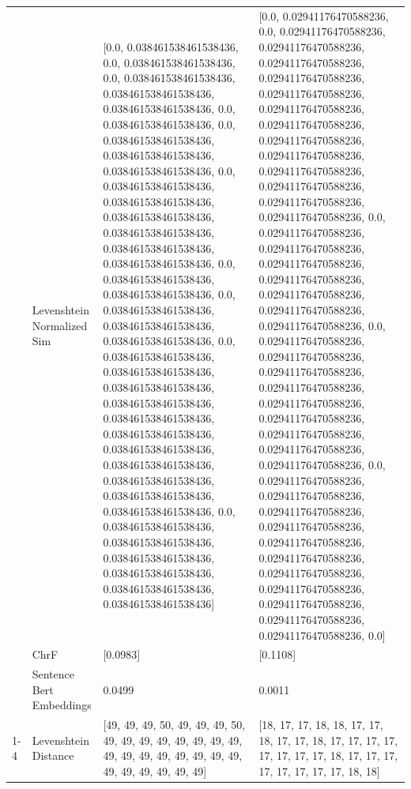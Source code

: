 \begin{tabular}{llll}
 & Levenshtein Normalized Sim & [0.0, 0.038461538461538436, 0.0, 0.038461538461538436, 0.0, 0.038461538461538436, 0.038461538461538436, 0.038461538461538436, 0.0, 0.038461538461538436, 0.0, 0.038461538461538436, 0.038461538461538436, 0.038461538461538436, 0.0, 0.038461538461538436, 0.038461538461538436, 0.038461538461538436, 0.038461538461538436, 0.038461538461538436, 0.038461538461538436, 0.0, 0.038461538461538436, 0.038461538461538436, 0.0, 0.038461538461538436, 0.038461538461538436, 0.038461538461538436, 0.0, 0.038461538461538436, 0.038461538461538436, 0.038461538461538436, 0.038461538461538436, 0.038461538461538436, 0.038461538461538436, 0.038461538461538436, 0.038461538461538436, 0.038461538461538436, 0.038461538461538436, 0.038461538461538436, 0.0, 0.038461538461538436, 0.038461538461538436, 0.038461538461538436, 0.038461538461538436, 0.038461538461538436, 0.038461538461538436] & [0.0, 0.02941176470588236, 0.0, 0.02941176470588236, 0.02941176470588236, 0.02941176470588236, 0.02941176470588236, 0.02941176470588236, 0.02941176470588236, 0.02941176470588236, 0.02941176470588236, 0.02941176470588236, 0.02941176470588236, 0.02941176470588236, 0.02941176470588236, 0.02941176470588236, 0.0, 0.02941176470588236, 0.02941176470588236, 0.02941176470588236, 0.02941176470588236, 0.02941176470588236, 0.02941176470588236, 0.02941176470588236, 0.0, 0.02941176470588236, 0.02941176470588236, 0.02941176470588236, 0.02941176470588236, 0.02941176470588236, 0.02941176470588236, 0.02941176470588236, 0.02941176470588236, 0.02941176470588236, 0.0, 0.02941176470588236, 0.02941176470588236, 0.02941176470588236, 0.02941176470588236, 0.02941176470588236, 0.02941176470588236, 0.02941176470588236, 0.02941176470588236, 0.02941176470588236, 0.02941176470588236, 0.02941176470588236, 0.0] \\
 & ChrF & [0.0983] & [0.1108] \\
 & Sentence Bert Embeddings & 0.0499 & 0.0011 \\
\cline{1-4}
\multirow[t]{4}{*}{Kuhika ni kuna} & Levenshtein Distance & [49, 49, 49, 50, 49, 49, 49, 50, 49, 49, 49, 49, 49, 49, 49, 49, 49, 49, 49, 49, 49, 49, 49, 49, 49, 49, 49, 49, 49, 49] & [18, 17, 17, 18, 18, 17, 17, 18, 17, 17, 18, 17, 17, 17, 17, 17, 17, 17, 17, 18, 17, 17, 17, 17, 17, 17, 17, 17, 18, 18] \\

\end{tabular}
